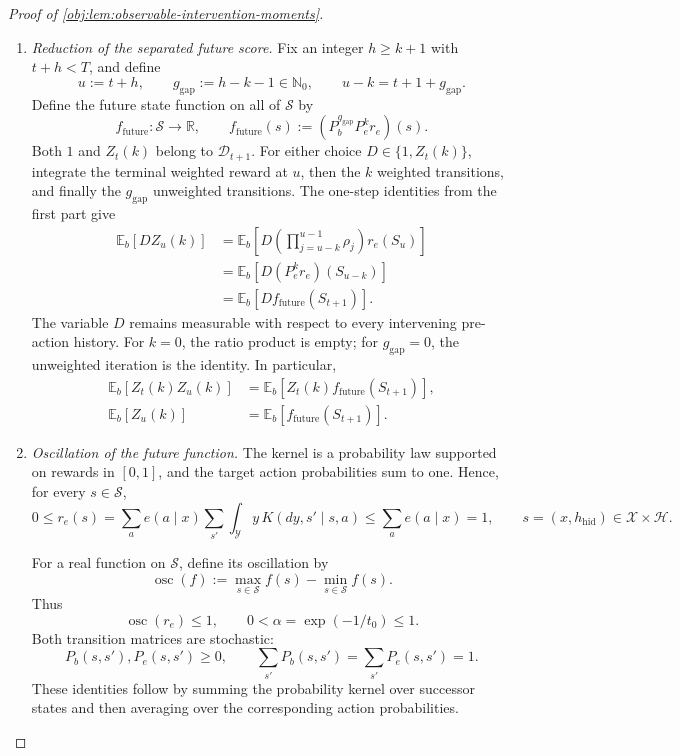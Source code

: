 \documentclass[11pt]{article}
\begin{document}
\begin{proof}[Proof of \cref{obj:lem:observable-intervention-moments}]
\begin{enumerate}
\item \emph{Reduction of the separated future score.}
Fix an integer \(h\ge k+1\) with \(t+h<T\), and define
\[
u:=t+h,\qquad
g_{\mathrm{gap}}:=h-k-1\in\mathbb N_0,
\qquad
u-k=t+1+g_{\mathrm{gap}}.
\]
Define the future state function on all of \(\mathcal S\) by
\[
f_{\mathrm{future}}:\mathcal S\longrightarrow\mathbb R,
\qquad
f_{\mathrm{future}}(s)
:=
(P_b^{g_{\mathrm{gap}}}P_e^kr_e)(s).
\]
Both \(1\) and \(Z_t(k)\) belong to \(\mathcal D_{t+1}\). For either choice \(D\in\{1,Z_t(k)\}\), integrate the terminal weighted reward at \(u\), then the \(k\) weighted transitions, and finally the \(g_{\mathrm{gap}}\) unweighted transitions. The one-step identities from the first part give
\[
\begin{aligned}
\mathbb E_b[DZ_u(k)]
&=
\mathbb E_b\!\left[
D\left(\prod_{j=u-k}^{u-1}\rho_j\right)r_e(S_u)
\right]\\
&=
\mathbb E_b[D(P_e^kr_e)(S_{u-k})]\\
&=
\mathbb E_b[D f_{\mathrm{future}}(S_{t+1})].
\end{aligned}
\]
The variable \(D\) remains measurable with respect to every intervening pre-action history. For \(k=0\), the ratio product is empty; for \(g_{\mathrm{gap}}=0\), the unweighted iteration is the identity. In particular,
\[
\begin{aligned}
\mathbb E_b[Z_t(k)Z_u(k)]
&=\mathbb E_b[Z_t(k)f_{\mathrm{future}}(S_{t+1})],\\
\mathbb E_b[Z_u(k)]
&=\mathbb E_b[f_{\mathrm{future}}(S_{t+1})].
\end{aligned}
\]

\item \emph{Oscillation of the future function.}
The kernel is a probability law supported on rewards in \([0,1]\), and the target action probabilities sum to one. Hence, for every \(s\in\mathcal S\),
\[
0
\le r_e(s)
=\sum_a e(a\mid x)\sum_{s'}\int_{\mathcal Y}y\,K(dy,s'\mid s,a)
\le\sum_a e(a\mid x)
=1,
\qquad s=(x,h_{\mathrm{hid}})\in\mathcal X\times\mathcal H.
\]

For a real function on \(\mathcal S\), define its oscillation by
\[
\operatorname{osc}(f):=\max_{s\in\mathcal S}f(s)-\min_{s\in\mathcal S}f(s).
\]
Thus
\[
\operatorname{osc}(r_e)\le1,
\qquad
0<\alpha=\exp(-1/t_0)\le1.
\]
Both transition matrices are stochastic:
\[
P_b(s,s'),P_e(s,s')\ge0,\qquad
\sum_{s'}P_b(s,s')=\sum_{s'}P_e(s,s')=1.
\]
These identities follow by summing the probability kernel over successor states and then averaging over the corresponding action probabilities.


\end{enumerate}
\end{proof}
\end{document}
